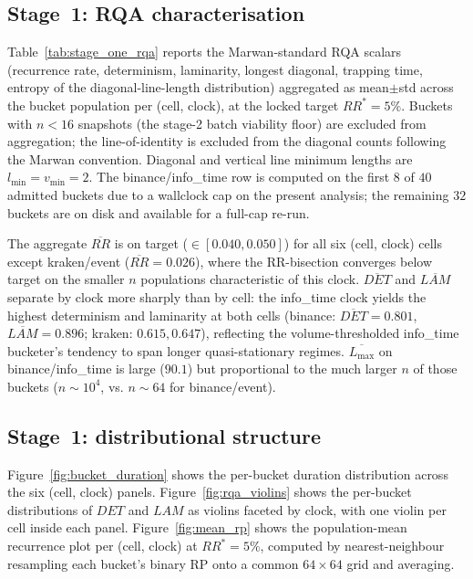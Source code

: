 \subsection*{Stage~1: RQA characterisation}
Table~\ref{tab:stage_one_rqa} reports the Marwan-standard RQA scalars
(recurrence rate, determinism, laminarity, longest diagonal,
trapping time, entropy of the diagonal-line-length distribution)
aggregated as mean$\pm$std across the bucket population per (cell,
clock), at the locked target $RR^{*} = 5\%$. Buckets with $n < 16$
snapshots (the stage-2 batch viability floor) are excluded from
aggregation; the line-of-identity is excluded from the diagonal
counts following the Marwan convention. Diagonal and vertical line
minimum lengths are $l_{\min} = v_{\min} = 2$. The binance/info\_time
row is computed on the first $8$ of $40$ admitted buckets due to a
wallclock cap on the present analysis; the remaining $32$ buckets are
on disk and available for a full-cap re-run.



The aggregate $\overline{RR}$ is on target ($\in [0.040, 0.050]$) for
all six (cell, clock) cells except kraken/event ($\overline{RR} =
0.026$), where the RR-bisection converges below target on the smaller
$n$ populations characteristic of this clock. $\overline{DET}$ and
$\overline{LAM}$ separate by clock more sharply than by cell: the
info\_time clock yields the highest determinism and laminarity at
both cells (binance: $\overline{DET} = 0.801$,
$\overline{LAM} = 0.896$; kraken: $0.615, 0.647$), reflecting the
volume-thresholded info\_time bucketer's tendency to span longer
quasi-stationary regimes. $\overline{L_{\max}}$ on
binance/info\_time is large ($90.1$) but proportional to the
much larger $n$ of those buckets ($n \sim 10^4$, vs. $n \sim 64$
for binance/event).

\subsection*{Stage~1: distributional structure}
Figure~\ref{fig:bucket_duration} shows the per-bucket duration
distribution across the six (cell, clock) panels.
Figure~\ref{fig:rqa_violins} shows the per-bucket distributions of
$DET$ and $LAM$ as violins faceted by clock, with one violin per cell
inside each panel. Figure~\ref{fig:mean_rp} shows the population-mean
recurrence plot per (cell, clock) at $RR^{*} = 5\%$, computed by
nearest-neighbour resampling each bucket's binary RP onto a common
$64 \times 64$ grid and averaging.

